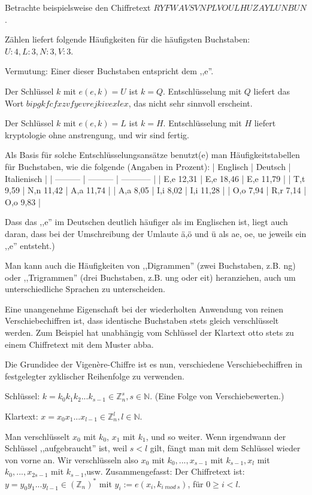 \documentclass[a4paper]{article}
\begin{document}
\begin{multicols}{3}
    Betrachte beispielsweise den Chiffretext $RYFWAVSVNPLVOULHUZAYLUNBUN$.
    \begin{itemize*}
        \item Zählen liefert folgende Häufigkeiten für die häufigsten Buchstaben: $U:4,L:3,N:3,V:3$.
        \item Vermutung: Einer dieser Buchstaben entspricht dem ,,e''.
        \item Der Schlüssel $k$ mit $e(e,k)=U$ ist $k=Q$. Entschlüsselung mit $Q$ liefert das Wort $bipgkfcfxzvfyevrejkivexlex$, das nicht sehr sinnvoll erscheint.
        \item Der Schlüssel $k$ mit $e(e,k)=L$ ist $k=H$. Entschlüsselung mit $H$ liefert kryptologie ohne anstrengung, und wir sind fertig.
        \item Als Basis für solche Entschlüsselungsansätze benutzt(e) man Häufigkeitstabellen für Buchstaben, wie die folgende (Angaben in Prozent):
        | Englisch  | Deutsch   | Italienisch |
        | --------- | --------- | ----------- |
        | E,e 12,31 | E,e 18,46 | E,e 11,79   |
        | T,t 9,59  | N,n 11,42 | A,a 11,74   |
        | A,a 8,05  | I,i 8,02  | I,i 11,28   |
        | O,o 7,94  | R,r 7,14  | O,o 9,83    |
        \item Dass das ,,e'' im Deutschen deutlich häufiger als im Englischen ist, liegt auch daran, dass bei der Umschreibung der Umlaute ä,ö und ü als ae, oe, ue jeweils ein ,,e'' entsteht.)
    \end{itemize*}

    Man kann auch die Häufigkeiten von ,,Digrammen'' (zwei Buchstaben, z.B. ng) oder ,,Trigrammen''  (drei Buchstaben, z.B. ung oder eit) heranziehen, auch um unterschiedliche Sprachen zu unterscheiden.

    Eine unangenehme Eigenschaft bei der wiederholten Anwendung von reinen Verschiebechiffren ist, dass identische Buchstaben stets gleich verschlüsselt werden. Zum Beispiel hat unabhängig vom Schlüssel der Klartext otto stets zu einem Chiffretext mit dem Muster abba.

    Die Grundidee der Vigenère-Chiffre ist es nun, verschiedene Verschiebechiffren in festgelegter zyklischer Reihenfolge zu verwenden.

    Schlüssel: $k=k_0 k_1 k_2 ...k_{s-1}\in\mathbb{Z}^s_n,s\in\mathbb{N}$. (Eine Folge von Verschiebewerten.)

    Klartext: $x=x_0 x_1...x_{l-1} \in\mathbb{Z}^l_n,l\in\mathbb{N}$.

    Man verschlüsselt $x_0$ mit $k_0$, $x_1$ mit $k_1$, und so weiter. Wenn irgendwann der Schlüssel ,,aufgebraucht'' ist, weil $s<l$ gilt, fängt man mit dem Schlüssel wieder von vorne an. Wir verschlüsseln also $x_0$ mit $k_0,...,x_{s-1}$ mit $k_{s-1},x_l$ mit $k_0,...,x_{2s-1}$ mit $k_{s-1}$,usw.
    Zusammengefasst: Der Chiffretext ist: $y=y_0 y_1...y_{l-1}\in(\mathbb{Z}_n)^*$ mit $y_i:=e(x_i,k_{i\ mod\ s})$, für $0\geq i < l$.


\end{multicols}
\end{document}
